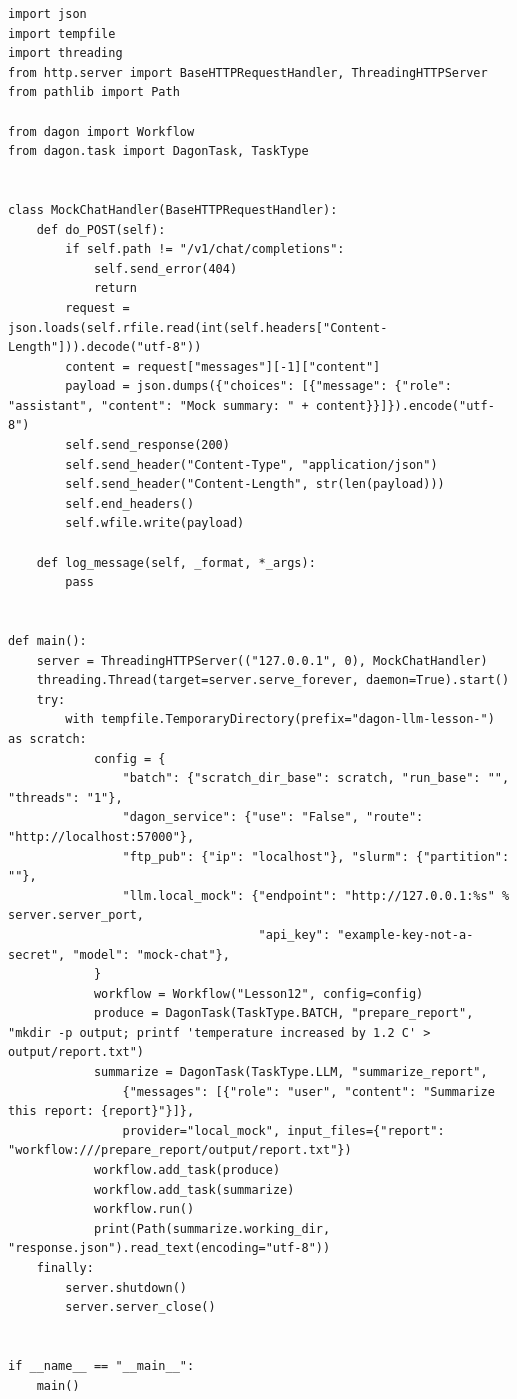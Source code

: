 \begin{lstlisting}[caption={\texttt{lesson\_12\_llm\_tasks.py}: a self-contained, mock-backed LLM workflow.}]
import json
import tempfile
import threading
from http.server import BaseHTTPRequestHandler, ThreadingHTTPServer
from pathlib import Path

from dagon import Workflow
from dagon.task import DagonTask, TaskType


class MockChatHandler(BaseHTTPRequestHandler):
    def do_POST(self):
        if self.path != "/v1/chat/completions":
            self.send_error(404)
            return
        request = json.loads(self.rfile.read(int(self.headers["Content-Length"])).decode("utf-8"))
        content = request["messages"][-1]["content"]
        payload = json.dumps({"choices": [{"message": {"role": "assistant", "content": "Mock summary: " + content}}]}).encode("utf-8")
        self.send_response(200)
        self.send_header("Content-Type", "application/json")
        self.send_header("Content-Length", str(len(payload)))
        self.end_headers()
        self.wfile.write(payload)

    def log_message(self, _format, *_args):
        pass


def main():
    server = ThreadingHTTPServer(("127.0.0.1", 0), MockChatHandler)
    threading.Thread(target=server.serve_forever, daemon=True).start()
    try:
        with tempfile.TemporaryDirectory(prefix="dagon-llm-lesson-") as scratch:
            config = {
                "batch": {"scratch_dir_base": scratch, "run_base": "", "threads": "1"},
                "dagon_service": {"use": "False", "route": "http://localhost:57000"},
                "ftp_pub": {"ip": "localhost"}, "slurm": {"partition": ""},
                "llm.local_mock": {"endpoint": "http://127.0.0.1:%s" % server.server_port,
                                   "api_key": "example-key-not-a-secret", "model": "mock-chat"},
            }
            workflow = Workflow("Lesson12", config=config)
            produce = DagonTask(TaskType.BATCH, "prepare_report", "mkdir -p output; printf 'temperature increased by 1.2 C' > output/report.txt")
            summarize = DagonTask(TaskType.LLM, "summarize_report",
                {"messages": [{"role": "user", "content": "Summarize this report: {report}"}]},
                provider="local_mock", input_files={"report": "workflow:///prepare_report/output/report.txt"})
            workflow.add_task(produce)
            workflow.add_task(summarize)
            workflow.run()
            print(Path(summarize.working_dir, "response.json").read_text(encoding="utf-8"))
    finally:
        server.shutdown()
        server.server_close()


if __name__ == "__main__":
    main()
\end{lstlisting}

